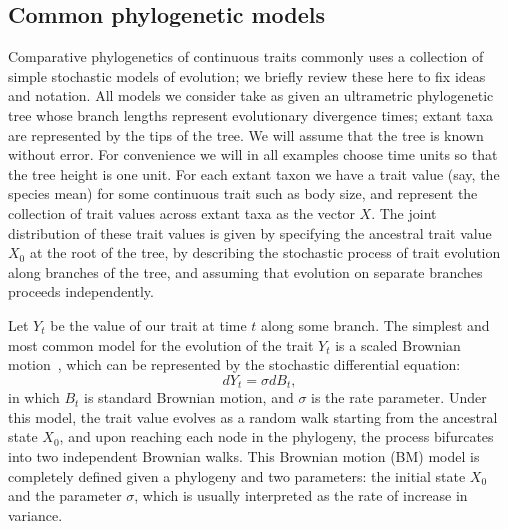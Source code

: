 \subsection{Common phylogenetic models} \label{ss:models}
Comparative phylogenetics of continuous traits commonly uses 
a collection of simple stochastic models of evolution;
we briefly review these here to fix ideas and notation.
All models we consider take as given an ultrametric phylogenetic tree whose branch lengths represent evolutionary divergence times;
extant taxa are represented by the tips of the tree.
We will assume that the tree is known without error. 
For convenience we will in all examples choose time units so that the tree height is one unit.
For each extant taxon we have a trait value (say, the species mean) for some continuous trait such as body size, and represent the collection of trait values across extant taxa as the vector $X$.  
The joint distribution of these trait values is given by specifying the ancestral trait value $X_0$ at the root of the tree, 
by describing the stochastic process of trait evolution along branches of the tree,
and assuming that evolution on separate branches proceeds independently.

Let $Y_t$ be the value of our trait at time $t$ along some branch.  
The simplest and most common model for the evolution of the trait $Y_t$ is
a scaled Brownian motion~\citep{Felsenstein1985}, 
which can be represented by the stochastic differential equation:
\begin{equation}
dY_t = \sigma dB_t ,
\label{bm}
\end{equation}
in which $B_t$ is standard Brownian motion, and $\sigma$ is the rate parameter.
Under this model, 
the trait value evolves as a random walk starting from the ancestral state $X_0$,
and upon reaching each node in the phylogeny, the process bifurcates into two independent Brownian walks.  
This Brownian motion (BM) model is completely defined given a phylogeny and two parameters: 
the initial state $X_0$ and the parameter $\sigma$, which is usually interpreted as the rate of increase in variance.

